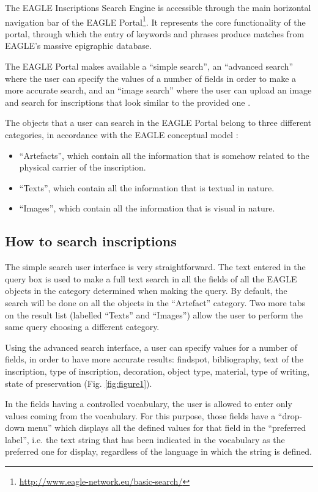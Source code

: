 \documentclass[amsthm,ebook]{saparticle}
\begin{document}
\noindent The EAGLE Inscriptions Search Engine is accessible through the main horizontal navigation bar of the EAGLE
Portal\footnote{\url{http://www.eagle-network.eu/basic-search/}}. It represents the core functionality of the portal,
through which the entry of keywords and phrases produce matches from EAGLE’s massive epigraphic database.

The EAGLE Portal makes available a ``simple search'', an ``advanced search'' where the user can specify the values of a
number of fields in order to make a more accurate search, and an ``image search'' where the user can upload an image and
search for inscriptions that look similar to the provided one \citep{prandoni_eagle_2014}. 

The objects that a user can search in the EAGLE Portal belong to three different categories, in accordance with the
EAGLE conceptual model \citep{sicilia_eagle_2015}:

\begin{itemize}
\item ``Artefacts'', which contain all the information that is somehow related to the physical carrier of the inscription.
\item ``Texts'', which contain all the information that is textual in nature.
\item ``Images'', which contain all the information that is visual in nature.
\end{itemize}

\subsection{How to search inscriptions}

\noindent The simple search user interface is very straightforward. The text entered in the query box is used to make a full text
search in all the fields of all the EAGLE objects in the category determined when making the query. By default, the
search will be done on all the objects in the ``Artefact'' category. Two more tabs on the result list (labelled ``Texts''
and ``Images'') allow the user to perform the same query choosing a different category.

Using the advanced search interface, a user can specify values for a number of fields, in order to have more accurate
results: findspot, bibliography, text of the inscription, type of inscription, decoration, object type, material, type
of writing, state of preservation (Fig. \ref{fig:figure1}).

In the fields having a controlled vocabulary, the user is allowed to enter only values coming from the vocabulary. For
this purpose, those fields have a ``drop-down menu'' which displays all the defined values for that field in the
``preferred label'', i.e. the text string that has been indicated in the vocabulary as the preferred one for display,
regardless of the language in which the string is defined. 
\end{document}
